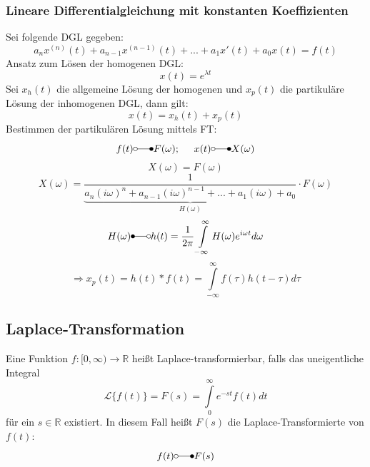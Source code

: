 \documentclass[a4paper,twocolumn,10pt]{article}
\begin{document}
\subsubsection{Lineare Differentialgleichung mit konstanten Koeffizienten}
Sei folgende DGL gegeben:
\begin{equation*}
a_nx^{(n)}(t)+a_{n-1}x^{(n-1)}(t)+...+a_1x'(t)+a_0x(t)=f(t)
\end{equation*}
Ansatz zum Lösen der homogenen DGL:
\begin{equation*}
x(t)=e^{\lambda t}
\end{equation*}
Sei $x_h(t)$ die allgemeine Lösung der homogenen und $x_p(t)$ die partikuläre Lösung der inhomogenen DGL, dann gilt:
\begin{equation*}
x(t)=x_h(t)+x_p(t)
\end{equation*}
Bestimmen der partikulären Lösung mittels FT:
\begin{equation*}
f(t)\laplace F(\omega);\;\;\;\;\;x(t)\laplace X(\omega)
\end{equation*}
\begin{equation*}
[a_n(i\omega)^n+a_{n-1}(i\omega)^{n-1}+...+a_1(i\omega)+a_0]X(\omega)=F(\omega)
\end{equation*}
\begin{equation*}
X(\omega)=\underbrace{\frac{1}{a_n(i\omega)^n+a_{n-1}(i\omega)^{n-1}+...+a_1(i\omega)+a_0}}_{H(\omega)} \cdot F(\omega)
\end{equation*}
\begin{equation*}
H(\omega)\Laplace h(t)=\frac{1}{2\pi}\int\limits_{-\infty}^{\infty}H(\omega)e^{i\omega t}d\omega
\end{equation*}
\begin{equation*}
\Rightarrow x_p(t)=h(t)*f(t)=\int\limits_{-\infty}^{\infty}f(\tau)h(t-\tau)d\tau
\end{equation*}

\subsection{Laplace-Transformation}
Eine Funktion $f:[0,\infty)\rightarrow\mathbb{R}$ heißt Laplace-transformierbar, falls das uneigentliche Integral
\begin{equation*}
\mathcal{L}\{f(t)\}=F(s)=\int\limits_{0}^{\infty}e^{-st}f(t)dt
\end{equation*}
für ein $s\in\mathbb{R}$ existiert.
In diesem Fall heißt $F(s)$ die Laplace-Transformierte von $f(t)$:
\begin{equation*}
f(t)\laplace F(s)
\end{equation*}
\end{document}
